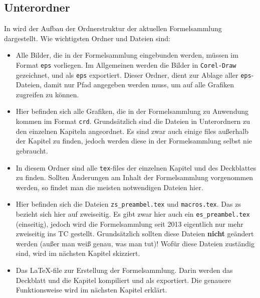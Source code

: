 \subsection{Unterordner }
In  wird der Aufbau der Ordnerstruktur der aktuellen
Formelsammlung dargestellt. Wie wichtigsten Ordner und Dateien sind:

\begin{itemize}
  \item {} Alle Bilder, die in der Formelsammlung eingebunden
    werden, müssen im Format {\tt eps} vorliegen. Im Allgemeinen werden die
    Bilder in {\tt Corel-Draw} gezeichnet, und als {\tt eps} exportiert. Dieser
    Ordner, dient zur Ablage aller {\tt eps}-Dateien, damit nur Pfad angegeben
    werden muss, um auf alle Grafiken zugreifen zu können.
  \item {} Hier befinden sich alle Grafiken, die
    in der Formelsammlung zu Anwendung kommen im Format {\tt crd}. 
    Grundsätzlich sind die Dateien in Unterordnern zu den einzelnen Kapiteln
    angeordnet. Es sind zwar auch einige files außerhalb der Kapitel zu finden,
    jedoch werden diese in der Formelsammlung selbst nie gebraucht.
  \item {} In diesem Ordner sind alle {\tt tex}-files der
    einzelnen Kapitel und des Deckblattes zu finden. Sollten Änderungen
    am Inhalt der Formelsammlung vorgenommen werden, so findet man die meisten
    notwendigen Dateien hier.
  \item {} Hier befinden sich die Dateien {\tt zs\_preambel.tex}
    und {\tt macros.tex}. Das \glqq{}zs\grqq{} bezieht sich hier auf 
    \glqq{}zweiseitig\grqq{}. Es gibt zwar hier auch ein {\tt es\_preambel.tex}
    (\glqq{}einseitig\grqq{}), jedoch wird die Formelsammlung seit 2013 
    eigentlich nur mehr zweiseitig ins TC gestellt. Grundsätzlich sollten diese
    Dateien {\bf nicht} geändert werden (außer man weiß genau, was man tut)!
    Wofür diese Dateien zuständig sind, wird im nächsten Kapitel skizziert.
  \item {} Das \LaTeX-file zur
    Erstellung der Formelsammlung. Darin werden das Deckblatt und die Kapitel
    kompiliert und als 
    exportiert. Die genauere Funktionsweise wird im nächsten Kapitel erklärt.
\end{itemize}

